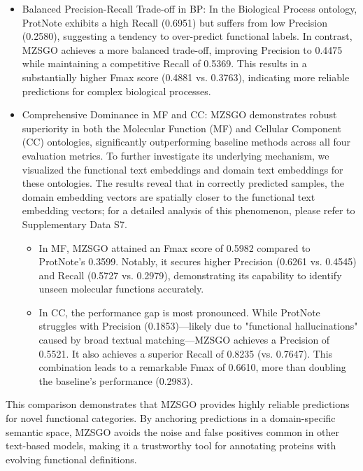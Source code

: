 \documentclass[unnumsec,webpdf,contemporary,large]{oup-authoring-template}%
\theoremstyle{thmstyleone}%
\theoremstyle{thmstyletwo}%
\theoremstyle{thmstylethree}%
\begin{document}
\begin{itemize}
    \item Balanced Precision-Recall Trade-off in BP: In the Biological Process ontology, ProtNote exhibits a high Recall (0.6951) but suffers from low Precision (0.2580), suggesting a tendency to over-predict functional labels. In contrast, MZSGO achieves a more balanced trade-off, improving Precision to 0.4475 while maintaining a competitive Recall of 0.5369. This results in a substantially higher Fmax score (0.4881 vs. 0.3763), indicating more reliable predictions for complex biological processes.
    
    \item Comprehensive Dominance in MF and CC: MZSGO demonstrates robust superiority in both the Molecular Function (MF) and Cellular Component (CC) ontologies, significantly outperforming baseline methods across all four evaluation metrics. To further investigate its underlying mechanism, we visualized the functional text embeddings and domain text embeddings for these ontologies. The results reveal that in correctly predicted samples, the domain embedding vectors are spatially closer to the functional text embedding vectors; for a detailed analysis of this phenomenon, please refer to Supplementary Data S7.
    \begin{itemize}
        \item In MF, MZSGO attained an Fmax score of 0.5982 compared to ProtNote's 0.3599. Notably, it secures higher Precision (0.6261 vs. 0.4545) and Recall (0.5727 vs. 0.2979), demonstrating its capability to identify unseen molecular functions accurately.
        \item In CC, the performance gap is most pronounced. While ProtNote struggles with Precision (0.1853)—likely due to "functional hallucinations" caused by broad textual matching—MZSGO achieves a Precision of 0.5521. It also achieves a superior Recall of 0.8235 (vs. 0.7647). This combination leads to a remarkable Fmax of 0.6610, more than doubling the baseline's performance (0.2983).
    \end{itemize}
\end{itemize}

This comparison demonstrates that MZSGO provides highly reliable predictions for novel functional categories. By anchoring predictions in a domain-specific semantic space, MZSGO avoids the noise and false positives common in other text-based models, making it a trustworthy tool for annotating proteins with evolving functional definitions.
\end{document}
